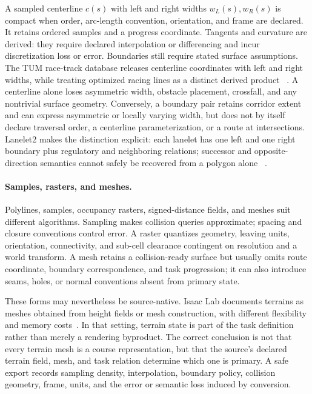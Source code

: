 A sampled centerline $c(s)$ with left and right widths $w_L(s),w_R(s)$ is compact
when order, arc-length convention, orientation, and frame are declared. It retains
ordered samples and a progress coordinate. Tangents and curvature are derived: they
require declared interpolation or differencing and incur discretization loss or error.
Boundaries still require stated surface assumptions. The TUM race-track database
releases centerline coordinates with left and right widths, while treating optimized
racing lines as a distinct derived product
~\cite{TUMFTM2020RaceTrack}. A centerline alone loses asymmetric width, obstacle
placement, crossfall, and any nontrivial surface geometry. Conversely, a boundary
pair retains corridor extent and can express asymmetric or locally varying width, but
does not by itself declare traversal order, a centerline parameterization, or a route
at intersections. Lanelet2 makes the distinction explicit: each lanelet has one left
and one right boundary plus regulatory and neighboring relations; successor and
opposite-direction semantics cannot safely be recovered from a polygon alone
~\cite{Poggenhans2018Lanelet2High}.

\paragraph{Samples, rasters, and meshes.}
Polylines, samples, occupancy rasters, signed-distance fields, and meshes suit different algorithms. Sampling makes collision queries approximate; spacing and closure conventions control error. A raster quantizes geometry, leaving units, orientation, connectivity, and sub-cell clearance contingent on resolution and a world transform. A mesh retains a collision-ready surface but usually omits route coordinate, boundary correspondence, and task progression; it can also introduce seams, holes, or normal conventions absent from primary state.

These forms may nevertheless be source-native. Isaac Lab documents terrains as meshes
obtained from height fields or mesh construction, with different flexibility and
memory costs~\cite{IsaacLabNodateIsaacLab}. In that setting, terrain state is part of
the task definition rather than merely a rendering byproduct. The correct conclusion
is not that every terrain mesh is a course representation, but that the source's
declared terrain field, mesh, and task relation determine which one is primary. A
safe export records sampling density, interpolation, boundary policy, collision
geometry, frame, units, and the error or semantic loss induced by conversion.

